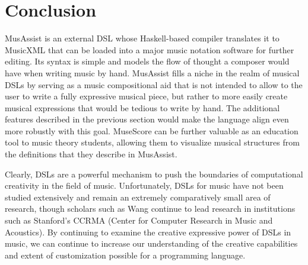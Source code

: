 \documentclass{report}
\begin{document}
\section{Conclusion}
MusAssist is an external DSL whose Haskell-based compiler translates it to MusicXML that can be loaded into a major music notation software for further editing. Its syntax is simple and models the flow of thought a composer would have when writing music by hand. MusAssist fills a niche in the realm of musical DSLs by serving as a music compositional aid that is not intended to allow to the user to write a fully expressive musical piece, but rather to more easily create musical expressions that would be tedious to write by hand. The additional features described in the previous section would make the language align even more robustly with this goal. MuseScore can be further valuable as an education tool to music theory students, allowing them to visualize musical structures from the definitions that they describe in MusAssist.

Clearly, DSLs are a powerful mechanism to push the boundaries of  computational creativity in the field of music. Unfortunately, DSLs for music have not been studied extensively  and  remain an extremely comparatively small area of research, though scholars such as  Wang continue to lead  research in institutions such as Stanford's CCRMA (Center for Computer Research in Music and Acoustics). By continuing to examine the creative expressive power of DSLs  in  music, we can continue to increase our understanding of the creative capabilities and extent of customization possible for  a programming language.



\end{document}
